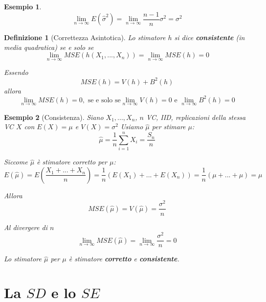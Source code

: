 \documentclass[
  11pt,
]{book}
\theoremstyle{mytheoremstyle}
\theoremstyle{mydefstyle}
\newtheorem{definition}{Definizione}[section]
\newtheorem{example}{{Esempio}}[section]
\begin{document}
\begin{example}
\[\lim_{n\to\infty}E(\hat\sigma^2)=\lim_{n\to\infty}\frac{n-1}n\sigma^2=\sigma^2\]
\end{example}

\begin{info}

\begin{definition}[Correttezza Asintotica]
Lo stimatore \(h\) si dice \textbf{consistente} (in media quadratica) se e solo se
\[\lim_{n\to\infty}MSE(h(X_1,...,X_n))=\lim_{n\to\infty}MSE(h)=0\]

Essendo
\[MSE(h)=V(h)+B^2(h)\]
allora
\[\lim_{n\to\infty} MSE(h)=0, \text{ se e solo se} \lim_{n\to\infty} V(h)=0 \text{ e } \lim_{n\to\infty} B^2(h)=0\]
\end{definition}

\end{info}

\begin{example}[Consistenza]
Siano \(X_1,...,X_n\), \(n\) VC, IID, replicazioni della stessa VC \(X\) con \(E(X)=\mu\) e \(V(X)=\sigma^2\)
Usiamo \(\hat \mu\) per stimare \(\mu\):
\[\hat \mu=\frac 1 n \sum_{i=1}^n X_i=\frac {S_n}n\]

Siccome \(\hat \mu\) è stimatore corretto per \(\mu\):
\[E(\hat \mu)=E\left(\frac{X_1+...+X_n}{n}\right)=\frac 1 n(E(X_1)+...+E(X_n))=\frac 1 n (\mu+...+\mu)=\mu\]

Allora
\[MSE(\hat \mu)=V(\hat \mu)=\frac {\sigma^2}n\]

Al divergere di \(n\)
\[\lim_{n\to \infty}MSE(\hat \mu)=\lim_{n\to\infty}\frac{\sigma^2}n=0\]

Lo stimatore \(\hat \mu\) per \(\mu\) è stimatore \textbf{corretto} e \textbf{consistente}.
\end{example}

\section{\texorpdfstring{La \(SD\) e lo \(SE\)}{La SD e lo SE}}\label{la-sd-e-lo-se}
\end{document}
